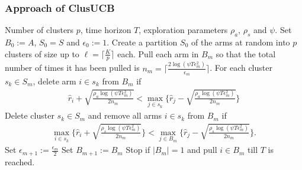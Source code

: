 \begin{frame}[allowframebreaks]
\frametitle{Approach of ClusUCB}
\begin{algorithmic}[1]
 Number of clusters $p$, time horizon $T$, exploration parameters $\rho_a$, $\rho_s$ and $\psi$.
 Set $B_{0}:=A$, $S_0 = S$ and $\epsilon_{0}:=1$.
\State Create a partition $S_0$ of the arms at random into $p$ clusters of size up to $\ell=\bigg\lceil \frac{K}{p} \bigg\rceil$ each.
\State Pull each arm in $B_m$ so that the total number of times it has been pulled is $n_{m}=\bigg\lceil\frac{2\log{(\psi T\epsilon_{m}^{2})}}{\epsilon_{m}}\bigg\rceil$. 
\ArmElim
\State For each cluster $s_k \in S_{m}$, delete arm ${i}\in s_{k}$ from $B_{m}$ if
\begin{align*}
\hat{r}_{i} + \sqrt{\frac{\rho_{a}\log{(\psi T\epsilon_{m}^{2})}}{2 n_{m}}}  < \max_{{j}\in s_{k}}\bigg\lbrace\hat{r}_{j} -\sqrt{\frac{\rho_{a}\log{(\psi T\epsilon_{m}^{2})}}{2 n_{m}}} \bigg\rbrace
\end{align*}
\EndArmElim
\ClusElim
\State Delete cluster $s_{k}\in S_{m}$ and remove all arms $i\in s_{k}$ from $B_{m}$ if 
\begin{align*}
 \max_{{i}\in s_{k}}\bigg\lbrace\hat{r}_{i} + \sqrt{\frac{\rho_{s}\log{(\psi T\epsilon_{m}^{2})}}{2 n_{m}}}\bigg\rbrace 
 < \max_{{j}\in B_{m}} \bigg\lbrace\hat{r}_{j} - \sqrt{\frac{\rho_{s} \log{(\psi T\epsilon_{m}^{2})}}{2 n_{m}}}\bigg\rbrace.
\end{align*}
\EndClusElim
\State Set $\epsilon_{m+1}:=\frac{\epsilon_{m}}{2}$\vspace{0.5ex}
\State Set $B_{m+1}:=B_{m}$
\State Stop if $|B_{m}|=1$ and pull ${i}\in B_{m}$ till $T$ is reached.
\EndFor
\end{algorithmic}
\end{frame}


